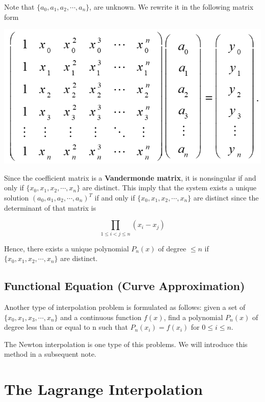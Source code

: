 \documentclass[
]{book}
\begin{document}
Note that \(\{a_0, a_1, a_2, \cdots, a_n \}\), are unknown. We rewrite it in the following matrix form

\begin{center}\includegraphics[width=0.6\linewidth]{img05/w05-interpolationEqMatrix} \end{center}

Since the coefficient matrix is a \textbf{Vandermonde matrix}, it is nonsingular if and only if \(\{x_0, x_1, x_2, \cdots, x_n \}\) are distinct. This imply that the system exists a unique solution \((a_0, a_1, a_2, \cdots, a_n)^T\) if and only if \(\{x_0, x_1, x_2, \cdots, x_n \}\) are distinct since the determinant of that matrix is

\[
\prod_{1 \le i < j \le n}(x_i-x_j)
\]

Hence, there exists a unique polynomial \(P_n(x)\) of degree \(\le n\) if \(\{x_0, x_1, x_2, \cdots, x_n \}\) are distinct.

\hfill\break

\hypertarget{functional-equation-curve-approximation}{%
\subsection{Functional Equation (Curve Approximation)}\label{functional-equation-curve-approximation}}

Another type of interpolation problem is formulated as follows: given a set of \(\{ x_0, x_1, x_3, \cdots, x_n\}\) and a continuous function \(f(x)\), find a polynomial \(P_n(x)\) of degree less than or equal to n such that \(P_n(x_i) = f(x_i)\) for \(0 \le i \le n\).

The Newton interpolation is one type of this problems. We will introduce this method in a subsequent note.

\hfill\break

\hypertarget{the-lagrange-interpolation}{%
\section{The Lagrange Interpolation}\label{the-lagrange-interpolation}}
\end{document}
